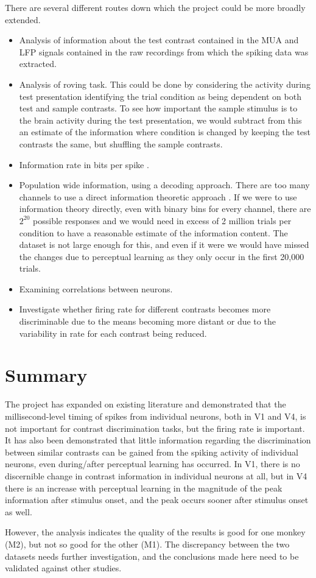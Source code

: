 There are several different routes down which the project could be more broadly extended.

\begin{itemize}
\item Analysis of information about the test contrast contained in the MUA and LFP signals contained in the raw recordings from which the spiking data was extracted.
\item Analysis of roving task. This could be done by considering the activity during test presentation identifying the trial condition as being dependent on both test and sample contrasts. To see how important the sample stimulus is to the brain activity during the test presentation, we would subtract from this an estimate of the information where condition is changed by keeping the test contrasts the same, but shuffling the sample contrasts.
\item Information rate in bits per spike \cite{Rolls2011}.
\item Population wide information, using a decoding approach. There are too many channels to use a direct information theoretic approach \cite{Quiroga2009}.
If we were to use information theory directly, even with binary bins for every channel, there are $2^20$ possible responses and we would need in excess of 2 million trials per condition to have a reasonable estimate of the information content. The dataset is not large enough for this, and even if it were we would have missed the changes due to perceptual learning as they only occur in the first 20,000 trials.
\item Examining correlations between neurons.
\item Investigate whether firing rate for different contrasts becomes more discriminable due to the means becoming more distant or due to the variability in rate for each contrast being reduced.
\end{itemize}

% 
\section{Summary}

The project has expanded on existing literature and demonstrated that the millisecond-level timing of spikes from individual neurons, both in V1 and V4, is not important for contrast discrimination tasks, but the firing rate is important. It has also been demonstrated that little information regarding the discrimination between similar contrasts can be gained from the spiking activity of individual neurons, even during/after perceptual learning has occurred. In V1, there is no discernible change in contrast information in individual neurons at all, but in V4 there is an increase with perceptual learning in the magnitude of the peak information after stimulus onset, and the peak occurs sooner after stimulus onset as well.

However, the analysis indicates the quality of the results is good for one monkey (M2), but not so good for the other (M1). The discrepancy between the two datasets needs further investigation, and the conclusions made here need to be validated against other studies.
